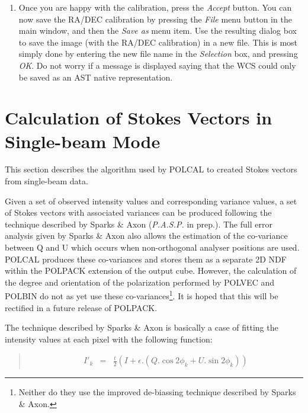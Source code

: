 \documentclass[twoside,11pt]{article}
\newcommand{\htmlref}[2]{#1}
\newcommand{\xlabel}[1]{}
\renewcommand{\_}{\texttt{\symbol{95}}}
\newenvironment{myquote}{\begin{quote}\begin{small}}{\end{small}\end{quote}}
\begin{document}
\begin{enumerate}
\item Once you are happy with the calibration, press the \emph{Accept}
button. You can now save the RA/DEC calibration by pressing the \emph{File} 
menu button in the main window, and then the \emph{Save as} menu item. Use the
resulting dialog box to save the image (with the RA/DEC calibration) in a
new file. This is most simply done by entering the new file name in the
\emph{Selection} box, and pressing \emph{OK}. Do not worry if a message is
displayed saying that the WCS could only be saved as an AST native
representation.

\end{enumerate}

\newpage

\section{\label{APP:SNGBM}\xlabel{CalculationofStokesVectorsinSingle-beamMode}
Calculation of Stokes Vectors in Single-beam Mode}

This section describes the algorithm used by \htmlref{POLCAL}{POLCAL} to 
created Stokes vectors from single-beam data.

Given a set of observed intensity values and corresponding variance values,
a set of Stokes vectors with associated variances can be produced
following the technique described by Sparks \& Axon (\emph{P.A.S.P.} in
prep.). The full error analysis given by Sparks \& Axon also allows the
estimation of the co-variance between Q and U which occurs when
non-orthogonal analyser positions are used. POLCAL produces these
co-variances and stores them as a separate 2D NDF within the POLPACK
extension of the output cube. However, the calculation of the degree and
orientation of the polarization performed by \htmlref{POLVEC}{POLVEC} and
\htmlref{POLBIN}{POLBIN} do not as yet use these co-variances\footnote{Neither
do they use the improved de-biassing technique described by Sparks \&
Axon.}. It is hoped that this will be rectified in a future release of
POLPACK.

The technique described by Sparks \& Axon is basically a case of fitting
the intensity values at each pixel with the following function:

\begin{myquote}
\begin{eqnarray}
  \label{EQN:IEXP}
  I'_{k} & = & \frac{t}{2}( I + \epsilon.( Q.\cos 2\phi_{k} + U.\sin 2\phi_{k} ) )
\end{eqnarray}
\end{myquote}
\end{document}
